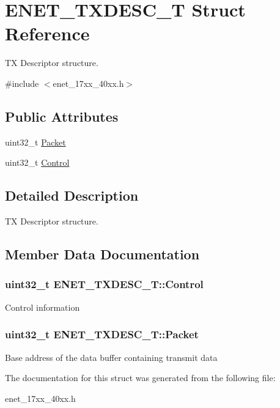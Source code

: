 \hypertarget{struct_e_n_e_t___t_x_d_e_s_c___t}{\section{E\+N\+E\+T\+\_\+\+T\+X\+D\+E\+S\+C\+\_\+\+T Struct Reference}
\label{struct_e_n_e_t___t_x_d_e_s_c___t}
}


T\+X Descriptor structure.  




{\ttfamily \#include $<$enet\+\_\+17xx\+\_\+40xx.\+h$>$}

\subsection*{Public Attributes}
\begin{DoxyCompactItemize}
\item 
uint32\+\_\+t \hyperlink{struct_e_n_e_t___t_x_d_e_s_c___t_aa32276326b2e5e4157e59d0f5553bae3}{Packet}
\item 
uint32\+\_\+t \hyperlink{struct_e_n_e_t___t_x_d_e_s_c___t_a7bbcf3f7943ab87b784dbca19e2698d5}{Control}
\end{DoxyCompactItemize}


\subsection{Detailed Description}
T\+X Descriptor structure. 

\subsection{Member Data Documentation}
\hypertarget{struct_e_n_e_t___t_x_d_e_s_c___t_a7bbcf3f7943ab87b784dbca19e2698d5}{
\subsubsection[{Control}]{\setlength{\rightskip}{0pt plus 5cm}uint32\+\_\+t E\+N\+E\+T\+\_\+\+T\+X\+D\+E\+S\+C\+\_\+\+T\+::\+Control}}\label{struct_e_n_e_t___t_x_d_e_s_c___t_a7bbcf3f7943ab87b784dbca19e2698d5}
Control information \hypertarget{struct_e_n_e_t___t_x_d_e_s_c___t_aa32276326b2e5e4157e59d0f5553bae3}{
\subsubsection[{Packet}]{\setlength{\rightskip}{0pt plus 5cm}uint32\+\_\+t E\+N\+E\+T\+\_\+\+T\+X\+D\+E\+S\+C\+\_\+\+T\+::\+Packet}}\label{struct_e_n_e_t___t_x_d_e_s_c___t_aa32276326b2e5e4157e59d0f5553bae3}
Base address of the data buffer containing transmit data 

The documentation for this struct was generated from the following file\+:\begin{DoxyCompactItemize}
\item 
enet\+\_\+17xx\+\_\+40xx.\+h\end{DoxyCompactItemize}
